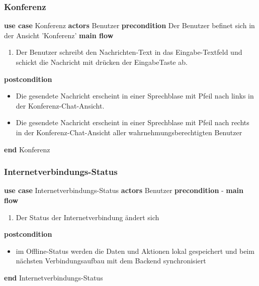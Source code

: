 \subsubsection{Konferenz}\label{subsubsec:uc_chatconf}
\noindent \textbf{use case} Konferenz \newline
\indent \textbf{actors} \newline
\indent \indent Benutzer \newline
\indent \textbf{precondition} \newline
\indent \indent Der Benutzer befinet sich in der Ansicht 'Konferenz' \newline
\indent \textbf{main flow}
\begin{enumerate}[labelwidth=0pt,leftmargin=39pt,noitemsep,topsep=0pt,parsep=0pt,partopsep=0pt]
\item Der Benutzer schreibt den Nachrichten-Text in das Eingabe-Textfeld und schickt die Nachricht mit drücken der EingabeTaste ab.
\end{enumerate}
\indent \indent \textbf{postcondition}
\begin{itemize}[label={},labelwidth=0pt,leftmargin=24pt,noitemsep,topsep=0pt,parsep=0pt,partopsep=0pt]
\item Die gesendete Nachricht erscheint in einer Sprechblase mit Pfeil nach links in der Konferenz-Chat-Ansicht.
\item Die gesendete Nachricht erscheint in einer Sprechblase mit Pfeil nach rechts in der Konferenz-Chat-Ansicht aller wahrnehmungsberechtigten Benutzer
\end{itemize}
\noindent \textbf{end} Konferenz

\subsubsection{Internetverbindungs-Status}\label{subsubsec:uc_watchconnstate}
\noindent \textbf{use case} Internetverbindungs-Status \newline
\indent \textbf{actors} \newline
\indent \indent Benutzer \newline
\indent \textbf{precondition} \newline
\indent \indent - \newline
\indent \textbf{main flow}
\begin{enumerate}[labelwidth=0pt,leftmargin=39pt,noitemsep,topsep=0pt,parsep=0pt,partopsep=0pt]
\item Der Status der Internetverbindung ändert sich
\end{enumerate}
\indent \indent \textbf{postcondition}
\begin{itemize}[label={},labelwidth=0pt,leftmargin=24pt,noitemsep,topsep=0pt,parsep=0pt,partopsep=0pt]
\item im Offline-Status werden die Daten und Aktionen lokal gespeichert und beim nächsten Verbindungsaufbau mit dem Backend synchronisiert
\end{itemize}
\noindent \textbf{end} Internetverbindungs-Status

